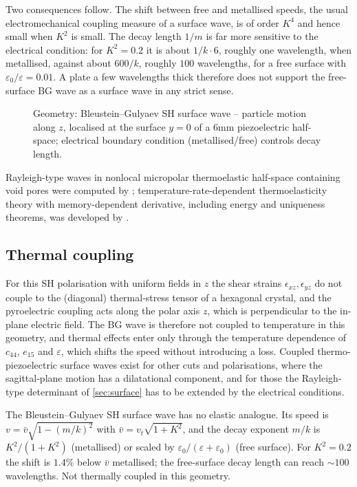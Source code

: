 Two consequences follow. The shift between free and metallised speeds, the usual electromechanical coupling measure of a surface wave, is of order $K^4$ and hence small when $K^2$ is small. The decay length $1/m$ is far more sensitive to the electrical condition: for $K^2=0.2$ it is about $1/k\cdot6$, roughly one wavelength, when metallised, against about $600/k$, roughly $100$ wavelengths, for a free surface with $\varepsilon_0/\varepsilon=0.01$. A plate a few wavelengths thick therefore does not support the free-surface BG wave as a surface wave in any strict sense.

\begin{figure}[t!]\centering\small

\caption{Geometry: Bleustein--Gulyaev SH surface wave -- particle motion along $z$, localised at the surface $y=0$ of a 6mm piezoelectric half-space; electrical boundary condition (metallised/free) controls decay length.}\label{fig:bg-geo}
\end{figure}

Rayleigh-type waves in nonlocal micropolar thermoelastic half-space containing void pores were computed by \citep{Kumar2024b}; temperature-rate-dependent thermoelasticity theory with memory-dependent derivative, including energy and uniqueness theorems, was developed by \citep{Singh2020d}.

\subsection{Thermal coupling}
For this SH polarisation with uniform fields in $z$ the shear strains $\epsilon_{xz},\epsilon_{yz}$ do not couple to the (diagonal) thermal-stress tensor of a hexagonal crystal, and the pyroelectric coupling acts along the polar axis $z$, which is perpendicular to the in-plane electric field. The BG wave is therefore not coupled to temperature in this geometry, and thermal effects enter only through the temperature dependence of $c_{44}$, $e_{15}$ and $\varepsilon$, which shifts the speed without introducing a loss. Coupled thermo-piezoelectric surface waves exist for other cuts and polarisations, where the sagittal-plane motion has a dilatational component, and for those the Rayleigh-type determinant of \cref{sec:surface} has to be extended by the electrical conditions.

\begin{summarybox}[Summary]
The Bleustein--Gulyaev SH surface wave has no elastic analogue. Its speed is $v=\bar v\sqrt{1-(m/k)^2}$ with $\bar v=v_t\sqrt{1+K^2}$, and the decay exponent $m/k$ is $K^2/(1+K^2)$ (metallised) or scaled by $\varepsilon_0/(\varepsilon+\varepsilon_0)$ (free surface). For $K^2=0.2$ the shift is $1.4\%$ below $\bar v$ metallised; the free-surface decay length can reach $\sim100$ wavelengths. Not thermally coupled in this geometry.
\end{summarybox}
